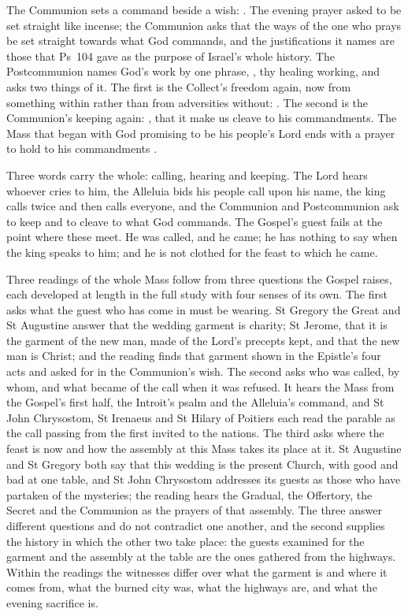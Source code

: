 The Communion sets a command beside a wish: . The evening prayer asked to be set straight like incense; the Communion
asks that the ways of the one who prays be set straight towards what God
commands, and the justifications it names are those that Ps~104 gave as the
purpose of Israel's whole history. The Postcommunion names God's work by one
phrase, , thy healing working, and asks
two things of it. The first is the Collect's freedom again, now from something
within rather than from adversities without: . The second is the Communion's keeping again: , that it make us cleave to his commandments.
The Mass that began with God promising to be his people's Lord  ends with a prayer to hold to his commandments .

Three words carry the whole: calling, hearing and keeping. The Lord hears
whoever cries to him, the Alleluia bids his people call upon his name, the king
calls twice and then calls everyone, and the Communion and Postcommunion ask to
keep and to cleave to what God commands. The Gospel's guest fails at the point where these meet. He was called, and
he came; he has nothing to say when the king speaks to him; and he is not
clothed for the feast to which he came.

Three readings of the whole Mass follow from three questions the Gospel raises,
each developed at length in the full study with four senses of its own.
The first asks what the guest who has come in must be wearing. St Gregory the
Great and St Augustine answer that the wedding garment is charity; St Jerome,
that it is the garment of the new man, made of the Lord's precepts kept, and
that the new man is Christ; and the reading finds that garment shown in the
Epistle's four acts and asked for in the Communion's wish. The second asks who
was called, by whom, and what became of the call when it was refused. It hears
the Mass from the Gospel's first half, the Introit's psalm and the Alleluia's
command, and St John Chrysostom, St
Irenaeus and St Hilary of Poitiers each read the parable as the call passing
from the first invited to the nations. The third asks where the feast is now
and how the assembly at this Mass takes its place at it. St Augustine and St
Gregory both say that this wedding is the present Church, with good and bad at
one table, and St John Chrysostom addresses its guests as those who have
partaken of the mysteries; the reading hears the Gradual, the Offertory, the
Secret and the Communion as the prayers of that assembly. The three answer
different questions and do not contradict one another, and the second supplies
the history in which the other two take place: the guests examined for the
garment and the assembly at the table are the ones gathered from the highways.
Within the readings the witnesses differ over what the garment is and where it
comes from, what the burned city was, what the highways are, and
what the evening sacrifice is.
